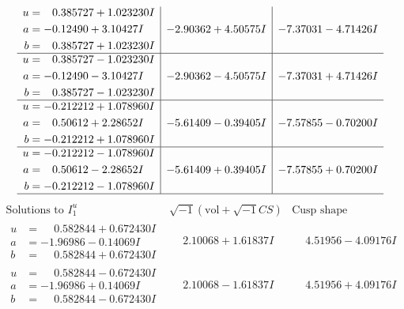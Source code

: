 \documentclass[1p]{elsarticle_modified}
\theoremstyle{definition}
\newcommand{\I}{\sqrt{-1}}
\begin{document}
$$\begin{array}{c|c|c}
\begin{aligned}
u &= \phantom{-}0.385727 + 1.023230 I \\
a &= -0.12490 + 3.10427 I \\
b &= \phantom{-}0.385727 + 1.023230 I\end{aligned}
 & -2.90362 + 4.50575 I & -7.37031 - 4.71426 I \\ \hline\begin{aligned}
u &= \phantom{-}0.385727 - 1.023230 I \\
a &= -0.12490 - 3.10427 I \\
b &= \phantom{-}0.385727 - 1.023230 I\end{aligned}
 & -2.90362 - 4.50575 I & -7.37031 + 4.71426 I \\ \hline\begin{aligned}
u &= -0.212212 + 1.078960 I \\
a &= \phantom{-}0.50612 + 2.28652 I \\
b &= -0.212212 + 1.078960 I\end{aligned}
 & -5.61409 - 0.39405 I & -7.57855 - 0.70200 I \\ \hline\begin{aligned}
u &= -0.212212 - 1.078960 I \\
a &= \phantom{-}0.50612 - 2.28652 I \\
b &= -0.212212 - 1.078960 I\end{aligned}
 & -5.61409 + 0.39405 I & -7.57855 + 0.70200 I\\
 \hline 
 \end{array}$$\newpage$$\begin{array}{c|c|c}  
\text{Solutions to }I^u_{1}& \I (\text{vol} + \sqrt{-1}CS) & \text{Cusp shape}\\
 \hline 
\begin{aligned}
u &= \phantom{-}0.582844 + 0.672430 I \\
a &= -1.96986 - 0.14069 I \\
b &= \phantom{-}0.582844 + 0.672430 I\end{aligned}
 & \phantom{-}2.10068 + 1.61837 I & \phantom{-}4.51956 - 4.09176 I \\ \hline\begin{aligned}
u &= \phantom{-}0.582844 - 0.672430 I \\
a &= -1.96986 + 0.14069 I \\
b &= \phantom{-}0.582844 - 0.672430 I\end{aligned}
 & \phantom{-}2.10068 - 1.61837 I & \phantom{-}4.51956 + 4.09176 I \\ \hline\begin{aligned}

\end{aligned}
\end{array}$$
\end{document}
